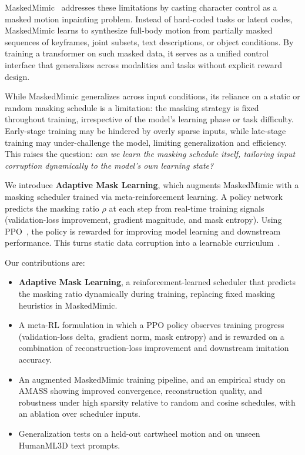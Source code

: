 \documentclass[10pt,letterpaper]{article}
\begin{document}
MaskedMimic~\cite{tessler2024maskedmimic} addresses these limitations by casting character control as a masked motion inpainting problem. Instead of hard-coded tasks or latent codes, MaskedMimic learns to synthesize full-body motion from partially masked sequences of keyframes, joint subsets, text descriptions, or object conditions. By training a transformer on such masked data, it serves as a unified control interface that generalizes across modalities and tasks without explicit reward design.

While MaskedMimic generalizes across input conditions, its reliance on a static or random masking schedule is a limitation: the masking strategy is fixed throughout training, irrespective of the model's learning phase or task difficulty. Early-stage training may be hindered by overly sparse inputs, while late-stage training may under-challenge the model, limiting generalization and efficiency. This raises the question: \emph{can we learn the masking schedule itself, tailoring input corruption dynamically to the model's own learning state?}

We introduce \textbf{Adaptive Mask Learning}, which augments MaskedMimic with a masking scheduler trained via meta-reinforcement learning. A policy network predicts the masking ratio $\rho$ at each step from real-time training signals (validation-loss improvement, gradient magnitude, and mask entropy). Using PPO~\cite{schulman2017ppo}, the policy is rewarded for improving model learning and downstream performance. This turns static data corruption into a learnable curriculum~\cite{bengio2009curriculum}.

Our contributions are:
\begin{itemize}
  \item \textbf{Adaptive Mask Learning}, a reinforcement-learned scheduler that predicts the masking ratio dynamically during training, replacing fixed masking heuristics in MaskedMimic.
  \item A meta-RL formulation in which a PPO policy observes training progress (validation-loss delta, gradient norm, mask entropy) and is rewarded on a combination of reconstruction-loss improvement and downstream imitation accuracy.
  \item An augmented MaskedMimic training pipeline, and an empirical study on AMASS showing improved convergence, reconstruction quality, and robustness under high sparsity relative to random and cosine schedules, with an ablation over scheduler inputs.
  \item Generalization tests on a held-out cartwheel motion and on unseen HumanML3D text prompts.
\end{itemize}
\end{document}
